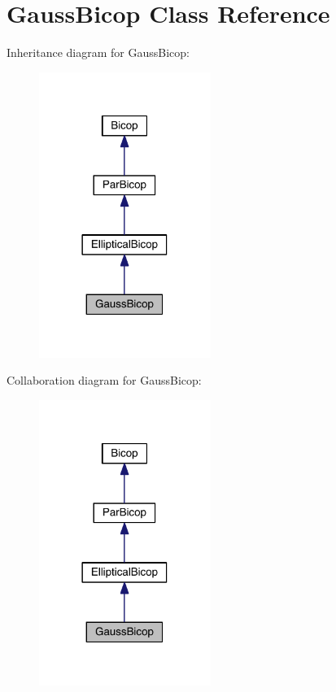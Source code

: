 \hypertarget{class_gauss_bicop}{}\section{Gauss\+Bicop Class Reference}
\label{class_gauss_bicop}


Inheritance diagram for Gauss\+Bicop\+:
\nopagebreak
\begin{figure}[H]
\begin{center}
\leavevmode
\includegraphics[width=158pt]{class_gauss_bicop__inherit__graph}
\end{center}
\end{figure}


Collaboration diagram for Gauss\+Bicop\+:
\nopagebreak
\begin{figure}[H]
\begin{center}
\leavevmode
\includegraphics[width=158pt]{class_gauss_bicop__coll__graph}
\end{center}
\end{figure}
